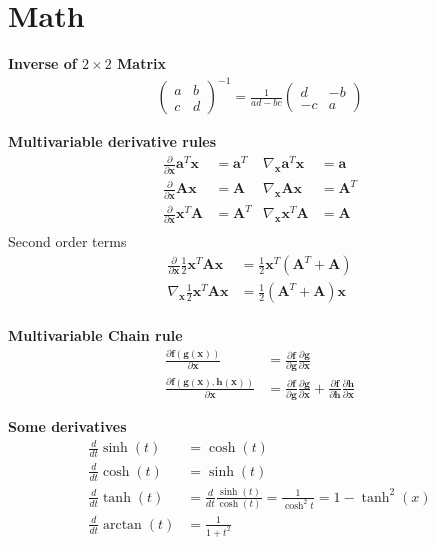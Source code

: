\section{Math}
\textbf{Inverse of \(2\times2\) Matrix}
\begin{align*}
    \begin{pmatrix}
        a & b \\ c & d 
        \end{pmatrix}^{-1} = 
    \frac{1}{ad-bc}
    \begin{pmatrix}
        d & -b \\ -c & a 
    \end{pmatrix}
\end{align*}

\textbf{Multivariable derivative rules}
\begin{align*}
    \frac{\partial}{\partial\bm{x}} \bm{a}^T\bm{x} &=  \bm{a}^T &
    \nabla_{\bm{x}}\bm{a}^T\bm{x} &=  \bm{a} \\
    \frac{\partial}{\partial\bm{x}} \bm{Ax} &=  \bm{A} &
    \nabla_{\bm{x}}\bm{Ax} &= \bm{A}^T  \\
    \frac{\partial}{\partial\bm{x}} \bm{x}^T\bm{A} &=  \bm{A}^T &
    \nabla_{\bm{x}}\bm{x}^T\bm{A} &= \bm{A} \\
\end{align*}
Second order terms
\begin{align*}
    \frac{\partial}{\partial\bm{x}} \frac{1}{2}\bm{x}^T\bm{Ax} &=  \frac{1}{2}\bm{x}^T(\bm{A}^T+\bm{A}) \\
    \nabla_{\bm{x}} \frac{1}{2}\bm{x}^T\bm{Ax} &=  \frac{1}{2}(\bm{A}^T+\bm{A})\bm{x} \\
\end{align*}

\textbf{Multivariable Chain rule}
\begin{align*}
    \frac{\partial\bm{f}(\bm{g}(\bm{x}))}{\partial\bm{x}} &= \frac{\partial\bm{f}}{\partial\bm{g}}
    \frac{\partial\bm{g}}{\partial\bm{x}} \\
    \frac{\partial\bm{f}(\bm{g}(\bm{x}),\bm{h}(\bm{x}))}{\partial\bm{x}} &= \frac{\partial\bm{f}}{\partial\bm{g}}
     \frac{\partial\bm{g}}{\partial\bm{x}} + \frac{\partial\bm{f}}{\partial\bm{h}}\frac{\partial\bm{h}}{\partial\bm{x}}
\end{align*}

\textbf{Some derivatives}
\begin{align*}
    \frac{d}{dt}\sinh(t) &= \cosh(t) \\
    \frac{d}{dt}\cosh(t) &= \sinh(t) \\
    \frac{d}{dt}\tanh(t) &= \frac{d}{dt}\frac{\sinh(t)}{\cosh(t)} = \frac{1}{\cosh^2t} = 1-\tanh^2(x) \\
    \frac{d}{dt}\arctan(t) &= \frac{1}{1+t^2} \\
\end{align*}
